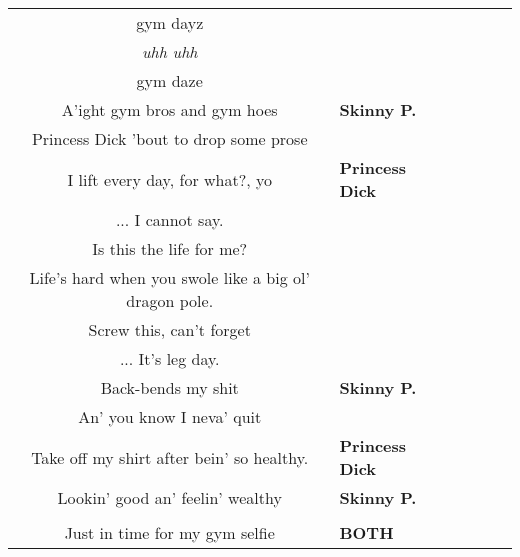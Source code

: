 \documentclass{article}
\begin{document}
\begin{center}
\begin{tabularx}{\linewidth}{c*{5}{X}}
gym dayz & \\
\textit{uhh uhh} & \\
gym daze & \\ \hline
A'ight gym bros and gym hoes & \textbf{Skinny P.} \\
Princess Dick 'bout to drop some prose & \\
\rowcolor{Gray}
I lift every day, for what?, yo & \textbf{Princess Dick}\\
\rowcolor{Gray}
... I cannot say. & \\
\rowcolor{Gray}
Is this the life for me? & \\
\rowcolor{Gray}
Life's hard when you swole like a big ol' dragon pole. & \\
\rowcolor{Gray}
Screw this, can't forget & \\
\rowcolor{Gray}
... It's leg day. & \\
Back-bends my shit & \textbf{Skinny P.}\\
An' you know I neva' quit & \\
\rowcolor{Gray}
Take off my shirt after bein' so healthy. & \textbf{Princess Dick}\\
Lookin' good an' feelin' wealthy & \textbf{Skinny P.}\\
&\\ \hline
Just in time for my gym selfie & \textbf{BOTH}\\ \hline
\end{tabularx}
\end{center}
\end{document}
